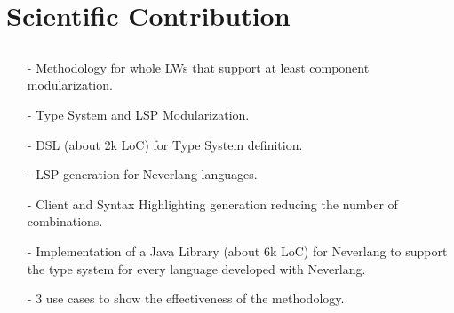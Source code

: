 \documentclass[9pt,xcolor=table,svgnames]{beamer}
\begin{document}


\section[Scientific Contribution]{Scientific Contribution}
\subsection[]{}
\begin{frame}{\secname}
    \framesubtitle{\subsecname}

    \begin{itemize}[itemsep=10pt]
        \item[\alert{-}] \alert{Methodology} for whole LWs that support at least component modularization.
        \item[\alert{-}] Type System and LSP \alert{Modularization}.
        \item[\alert{-}] \alert{DSL} (about 2k LoC) for Type System definition.
        \item[\alert{-}] \alert{LSP} generation for Neverlang languages.
        \item[\alert{-}] \alert{Client} and \alert{Syntax Highlighting} generation reducing the number of combinations.
        \item[\alert{-}] Implementation of a \alert{Java Library} (about 6k LoC) for \alert{Neverlang} to support the type system for every language developed with Neverlang.
        \item[\alert{-}] 3 \alert{use cases} to show the effectiveness of the methodology.
    \end{itemize}
\end{frame}
\end{document}
